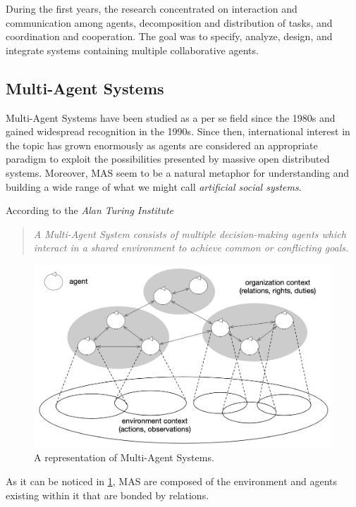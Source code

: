 During the first years, the research concentrated on interaction and communication among agents, decomposition and distribution of tasks, and coordination and cooperation.
The goal was to specify, analyze, design, and integrate systems containing multiple collaborative agents.

\subsection{Multi-Agent Systems}
Multi-Agent Systems have been studied as a per se field since the 1980s and gained widespread recognition in the 1990s.
Since then, international interest in the topic has grown enormously as agents are considered an appropriate paradigm to exploit the possibilities presented by massive open distributed systems.
Moreover, MAS seem to be a natural metaphor for understanding and building a wide range of what we might call \textit{artificial social systems}. \cite{wooldridge2009introduction}

According to the \textit{Alan Turing Institute} \cite{turing}
\begin{quote}
    \textit{A Multi-Agent System consists of multiple decision-making agents which interact in a shared environment to achieve common or conflicting goals.}
\end{quote}

\begin{figure}[H]
    \centering
    \includegraphics[width=0.9\linewidth]{images/multi-agent-systems.png}
    \caption{A representation of Multi-Agent Systems. \cite{jennings2000agent}}
    \label{fig:multi-agent-systems}
\end{figure}
As it can be noticed in \cref{fig:multi-agent-systems}, MAS are composed of the environment and agents existing within it that are bonded by relations.

